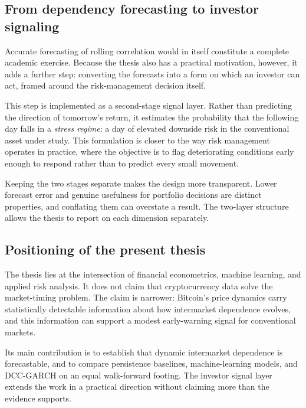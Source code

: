 \subsection{From dependency forecasting to investor signaling}

Accurate forecasting of rolling correlation would in itself constitute a complete academic exercise. Because the thesis also has a practical motivation, however, it adds a further step: converting the forecasts into a form on which an investor can act, framed around the risk-management decision itself.

This step is implemented as a second-stage signal layer. Rather than predicting the direction of tomorrow's return, it estimates the probability that the following day falls in a \emph{stress regime}: a day of elevated downside risk in the conventional asset under study. This formulation is closer to the way risk management operates in practice, where the objective is to flag deteriorating conditions early enough to respond rather than to predict every small movement.

Keeping the two stages separate makes the design more transparent. Lower forecast error and genuine usefulness for portfolio decisions are distinct properties, and conflating them can overstate a result. The two-layer structure allows the thesis to report on each dimension separately.

\subsection{Positioning of the present thesis}

The thesis lies at the intersection of financial econometrics, machine learning, and applied risk analysis. It does not claim that cryptocurrency data solve the market-timing problem. The claim is narrower: Bitcoin's price dynamics carry statistically detectable information about how intermarket dependence evolves, and this information can support a modest early-warning signal for conventional markets.

Its main contribution is to establish that dynamic intermarket dependence is forecastable, and to compare persistence baselines, machine-learning models, and DCC-GARCH on an equal walk-forward footing. The investor signal layer extends the work in a practical direction without claiming more than the evidence supports.
